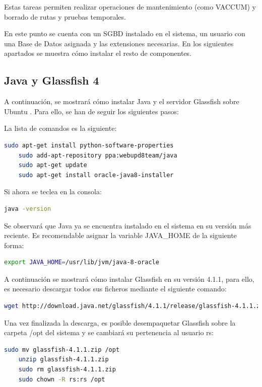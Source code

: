 Estas tareas permiten realizar operaciones de mantenimiento (como VACCUM) y borrado de rutas y pruebas temporales.

En este punto se cuenta con un SGBD instalado en el sistema, un usuario con una Base de Datos asignada y las extensiones necesarias. En los siguientes apartados se muestra cómo instalar el resto de componentes.

\subsection{Java y Glassfish 4}
A continuación, se mostrará cómo instalar Java y el servidor Glassfish sobre Ubuntu \cite{installjava:info}. Para ello, se han de seguir los siguientes pasos:

La lista de comandos es la siguiente:
\begin{lstlisting}[language=bash]
	sudo apt-get install python-software-properties
	sudo add-apt-repository ppa:webupd8team/java
	sudo apt-get update
	sudo apt-get install oracle-java8-installer
\end{lstlisting}

Si ahora se teclea en la consola:
\begin{lstlisting}[language=bash]
	java -version
\end{lstlisting}

Se observará que Java ya se encuentra instalado en el sistema en su versión más reciente.  Es recomendable asignar la variable JAVA\_HOME de la siguiente forma:

\begin{lstlisting}[language=bash]
	export JAVA_HOME=/usr/lib/jvm/java-8-oracle
\end{lstlisting}


A continuación se mostrará cómo instalar Glassfish en su versión 4.1.1, para ello, es necesario descargar todos sus ficheros mediante el siguiente comando:


\begin{lstlisting}[language=bash]
	wget http://download.java.net/glassfish/4.1.1/release/glassfish-4.1.1.zip
\end{lstlisting}

Una vez finalizada la descarga, es posible desempaquetar Glassfish sobre la carpeta /opt del sistema y se cambiará su pertenencia al usuario rs:

\begin{lstlisting}[language=bash]
	sudo mv glassfish-4.1.1.zip /opt
	unzip glassfish-4.1.1.zip
	sudo rm glassfish-4.1.1.zip
	sudo chown -R rs:rs /opt 
\end{lstlisting}

